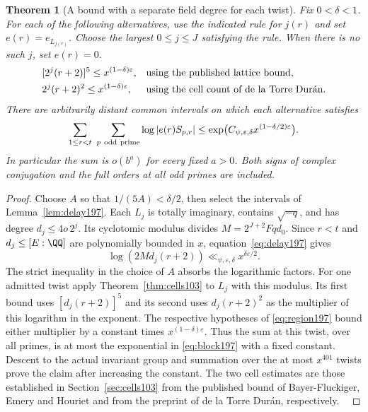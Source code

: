 \documentclass[a4paper,11pt]{article}
\newtheorem{theorem}[proposition]{Theorem}
\theoremstyle{definition}
\theoremstyle{remark}
\numberwithin{equation}{section}
\begin{document}
\begin{theorem}[A bound with a separate field degree for each twist]
\label{thm:region197}
Fix \(0<\delta<1\). For each of the following alternatives, use
the indicated rule for \(j(r)\) and set \(e(r)=e_{L_{j(r)}}\).
Choose the largest \(0\le j\le J\) satisfying the rule. When
there is no such \(j\), set \(e(r)=0\).
\begin{align}
 &[2^j(r+2)]^5\le x^{(1-\delta)\varepsilon},
                  &&\text{using the published lattice bound},\notag\\
 &2^j(r+2)^2\le x^{(1-\delta)\varepsilon},
                  &&\text{using the cell count of de la Torre Dur\'an}.
                                                        \label{eq:region197}
\end{align}
There are arbitrarily distant common intervals on which each
alternative satisfies
\begin{equation}
   \sum_{1\le r<t}\ \sum_{p\ {\rm odd\ prime}}
            \log|e(r) S_{p,r}|
     \le \exp\!\big(C_{\psi,\varepsilon,\delta}
                          x^{(1-\delta/2)\varepsilon}\big).
                                                         \label{eq:block197}
\end{equation}
In particular the sum is \(o(b^a)\) for every fixed \(a>0\).
Both signs of complex conjugation and the full orders at all
odd primes are included.
\end{theorem}
\begin{proof}
Choose \(A\) so that \(1/(5A)<\delta/2\), then select the
intervals of Lemma~\ref{lem:delay197}. Each \(L_j\) is totally
imaginary, contains \(\sqrt{-q}\), and has degree
\(d_j\le4o\,2^j\). Its cyclotomic modulus divides
\(M=2^{J+2}Fqd_0\). Since \(r<t\) and \(d_j\le[E:\QQ]\) are
polynomially bounded in \(x\), equation~\eqref{eq:delay197} gives
\[
          \log(2M d_j(r+2))\ll_{\psi,\varepsilon,\delta}
                           x^{\delta\varepsilon/2}.
\]
The strict inequality in the choice of \(A\) absorbs the
logarithmic factors. For one admitted twist apply
Theorem~\ref{thm:cells103} to \(L_j\) with this modulus. Its
first bound uses \([d_j(r+2)]^5\) and its second uses
\(d_j(r+2)^2\) as the multiplier of this logarithm in the
exponent. The respective hypotheses of \eqref{eq:region197}
bound either multiplier by a constant times
\(x^{(1-\delta)\varepsilon}\). Thus the sum at this twist,
over all primes, is at most the exponential in
\eqref{eq:block197} with a fixed constant. Descent to the actual
invariant group and summation over the at most \(x^{401}\) twists
prove the claim after increasing the constant. The two cell
estimates are those established in Section~\ref{sec:cells103}
from the published bound of Bayer-Fluckiger, Emery and Houriet
and from the preprint of de la Torre Dur\'an, respectively.
~\cite{IV-II-III-beh,IV-II-III-torre103}
\end{proof}
\end{document}
